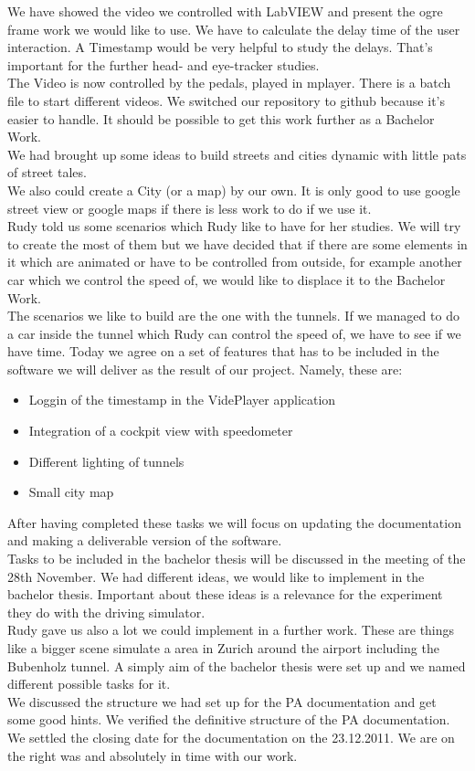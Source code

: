 We have showed the video we controlled with LabVIEW and present the ogre frame work we would like to use. 
We have to calculate the delay time of the user interaction. A Timestamp would be very helpful to study the delays. That's important for the further head- and eye-tracker studies. \\
The Video is now controlled by the pedals, played in mplayer.  There is a batch file to start different videos. 
We switched our repository to github because it's easier to handle.  
It should be possible to get this work further as a Bachelor Work.\\
We had brought up some ideas to build streets and cities dynamic with little pats of street tales. \\
We also could create a City (or a map) by our own. It is only good to use google street view or google maps if there is less work to do if we use it.\\
Rudy told us some scenarios which Rudy like to have for her studies. We will try to create the most of them but we have decided that if there are some elements in it which are animated or have to be controlled from outside, for example another car which we control the speed of, we would like to displace it to the Bachelor Work.  \\
The scenarios we like to build are the one with the tunnels. If we managed to do a car inside the tunnel which Rudy can control the speed of, we have to see if we have time. 
Today we agree on a set of features that has to be included in the software we will deliver as the result of our project. Namely, these are:
\begin{itemize}
\item Loggin of the timestamp in the VidePlayer application
\item Integration of a cockpit view with speedometer
\item Different lighting of tunnels
\item Small city map
\end{itemize}
After having completed these tasks we will focus on updating the documentation and making a deliverable version of the software.\\
Tasks to be included in the bachelor thesis will be discussed in the meeting of the 28th November.
We had different ideas, we would like to implement in the bachelor thesis. Important about these ideas is a relevance for the experiment they do with the driving simulator. \\
Rudy gave us also a lot we could implement in a further work. These are things like a bigger scene simulate a area in Zurich around the airport including the Bubenholz tunnel.  
A simply aim of the bachelor thesis were set up and we named different possible tasks for it. \\
We discussed the structure we had set up for the PA documentation and get some good hints.
We verified the definitive structure of the PA documentation. We settled the closing date for the documentation on the 23.12.2011. We are on the right was and absolutely in time with our work.